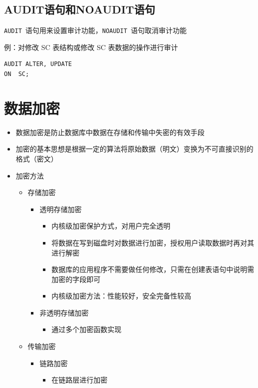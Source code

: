 \subsection{AUDIT语句和NOAUDIT语句}
\verb|AUDIT|\ 语句用来设置审计功能，\verb|NOAUDIT|\ 语句取消审计功能

例：对修改 SC 表结构或修改 SC 表数据的操作进行审计
\begin{lstlisting}
AUDIT ALTER, UPDATE  
ON  SC;
\end{lstlisting}

\section{数据加密}
\begin{itemize}
    \item 数据加密是防止数据库中数据在存储和传输中失密的有效手段
    \item 加密的基本思想是根据一定的算法将原始数据（明文）变换为不可直接识别的格式­（密文）
    \item 加密方法
    \begin{itemize}
        \item 存储加密
        \begin{itemize}
            \item 透明存储加密
            \begin{itemize}
                \item 内核级加密保护方式，对用户完全透明
                \item 将数据在写到磁盘时对数据进行加密，授权用户读取数据时再对其进行解密
                \item 数据库的应用程序不需要做任何修改，只需在创建表语句中说明需加密的字段即可
                \item 内核级加密方法：性能较好，安全完备性较高
            \end{itemize}
            \item 非透明存储加密
            \begin{itemize}
                \item 通过多个加密函数实现
            \end{itemize}
        \end{itemize}
        \item 传输加密
        \begin{itemize}
            \item 链路加密
            \begin{itemize}
                \item 在链路层进行加密

\end{itemize}
\end{itemize}
\end{itemize}
\end{itemize}

